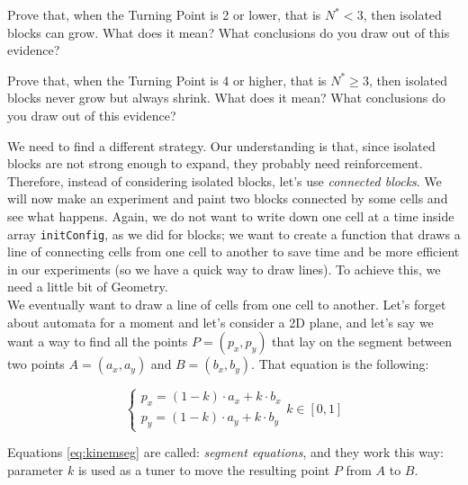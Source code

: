 \begin{problem}
\label{prob:highernblockslive}
Prove that, when the Turning Point is 2 or lower, that is $N^\ast < 3$, then isolated blocks can grow.
What does it mean? What conclusions do you draw out of this evidence?
\end{problem}

\begin{problem}
\label{prob:highernblockslive2}
Prove that, when the Turning Point is 4 or higher, that is $N^\ast \geq 3$, then isolated blocks never grow
but always shrink.
What does it mean? What conclusions do you draw out of this evidence?
\end{problem}

We need to find a different strategy. Our understanding is that, since isolated blocks are not
strong enough to expand, they probably need reinforcement. Therefore, instead of considering isolated
blocks, let's use \textit{connected blocks}. We will now make an experiment and paint two blocks
connected by some cells and see what happens. Again, we do not want to write down one cell at a time
inside array \texttt{initConfig}, as we did for blocks;
we want to create a function that
draws a line of connecting cells from one cell to another to save time and be more efficient
in our experiments (so we have a quick way to draw lines). To achieve this, we need a little bit
of Geometry.\\

We eventually want to draw a line of cells from one cell to another. Let's forget about
automata for a moment and let's consider a 2D plane, and let's say we want a way to find
all the points $P = (p_x, p_y)$ that lay on
the segment between two points $A = (a_x, a_y)$ and $B = (b_x, b_y)$.
That equation is the following:

\begin{equation}
\label{eq:kinemseg}
\begin{cases}
p_x = (1-k) \cdot a_x + k \cdot b_x\\
p_y = (1-k) \cdot a_y + k \cdot b_y
\end{cases}
k \in [0,1]
\end{equation}

Equations \ref{eq:kinemseg} are called: \textit{segment equations}, and they work 
this way: parameter $k$ is used as a tuner to move the resulting
point $P$ from $A$ to $B$.

